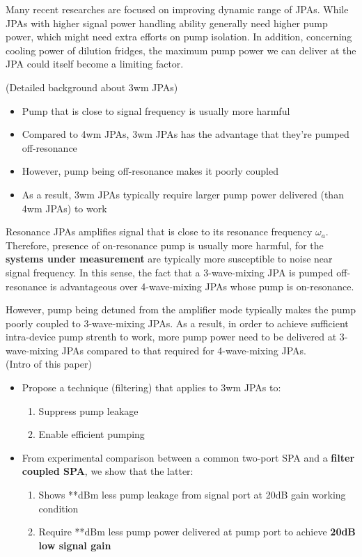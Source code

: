\documentclass[aip,reprint]{revtex4-2}
\begin{document}
Many recent researches are focused on improving dynamic range of JPAs. While JPAs with higher signal power handling ability generally need higher pump power, which might need extra efforts on pump isolation. In addition, concerning cooling power of dilution fridges, the maximum pump power we can deliver at the JPA could itself become a limiting factor. 

(Detailed background about 3wm JPAs)

\begin{itemize}
	\item Pump that is close to signal frequency is usually more harmful
	\item Compared to 4wm JPAs, 3wm JPAs has the advantage that they're pumped off-resonance
	\item However, pump being off-resonance makes it poorly coupled
	\item As a result, 3wm JPAs typically require larger pump power delivered (than 4wm JPAs) to work
\end{itemize}


Resonance JPAs amplifies signal that is close to its resonance frequency $\omega_a$. Therefore, presence of on-resonance pump is usually more harmful, for the \textbf{systems under measurement} are typically more susceptible to noise near signal frequency. In this sense, the fact that a 3-wave-mixing JPA is pumped off-resonance is advantageous over 4-wave-mixing JPAs whose pump is on-resonance. 

However, pump being detuned from the amplifier mode typically makes the pump poorly coupled to 3-wave-mixing JPAs. As a result, in order to achieve sufficient intra-device pump strenth to work, more pump power need to be delivered at 3-wave-mixing JPAs compared to that required for 4-wave-mixing JPAs. \\


(Intro of this paper)
\begin{itemize}
	\item Propose a technique (filtering) that applies to 3wm JPAs to:
	\begin{enumerate}
		\item Suppress pump leakage
		\item Enable efficient pumping
	\end{enumerate}
	\item From experimental comparison between a common two-port SPA and a \textbf{filter coupled SPA}, we show that the latter:  
	\begin{enumerate}
		\item Shows **dBm less pump leakage from signal port at 20dB gain working condition
		\item Require **dBm less pump power delivered at pump port to achieve \textbf{20dB low signal gain}
	\end{enumerate}
\end{itemize}
\end{document}
